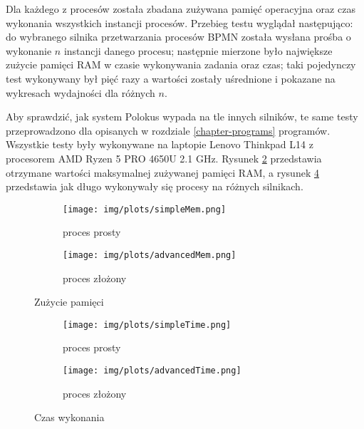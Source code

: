 \documentclass[declaration,shortabstract,mgr]{iithesis}
\newcommand{\bpmn}{BPMN }
\begin{document}
Dla każdego z procesów została zbadana zużywana pamięć operacyjna oraz czas wykonania wszystkich instancji procesów. Przebieg testu wyglądał następująco: do wybranego silnika przetwarzania procesów \bpmn została wysłana prośba o wykonanie $n$ instancji danego procesu; następnie mierzone było największe zużycie pamięci RAM w czasie wykonywania zadania oraz czas; taki pojedynczy test wykonywany był pięć razy a wartości zostały uśrednione i pokazane na wykresach wydajności dla różnych $n$.

Aby sprawdzić, jak system Polokus wypada na tle innych silników, te same testy przeprowadzono dla opisanych w rozdziale \ref{chapter-programs} programów. Wszystkie testy były wykonywane na laptopie Lenovo Thinkpad L14 z procesorem AMD Ryzen 5 PRO 4650U 2.1 GHz. Rysunek \ref{fig:mem} przedstawia otrzymane wartości maksymalnej zużywanej pamięci RAM, a rysunek \ref{fig:time} przedstawia jak długo wykonywały się procesy na różnych silnikach.

\begin{figure}[H]
     \centering
     \begin{subfigure}[b]{0.49\textwidth}
         \centering
         \texttt{[image: img/plots/simpleMem.png]}
         \caption{proces prosty}
     \end{subfigure}
     \hfill
     \begin{subfigure}[b]{0.49\textwidth}
         \centering
         \texttt{[image: img/plots/advancedMem.png]}
         \caption{proces złożony}
         \label{fig:mem-adv}
     \end{subfigure}
        \caption{Zużycie pamięci}
        \label{fig:mem}
\end{figure}

\begin{figure}[H]
     \centering
     \begin{subfigure}[b]{0.49\textwidth}
         \centering
         \texttt{[image: img/plots/simpleTime.png]}
         \caption{proces prosty}
     \end{subfigure}
     \hfill
     \begin{subfigure}[b]{0.49\textwidth}
         \centering
         \texttt{[image: img/plots/advancedTime.png]}
         \caption{proces złożony}
         \label{fig:time-adv}
     \end{subfigure}
        \caption{Czas wykonania}
        \label{fig:time}
\end{figure}
\end{document}
